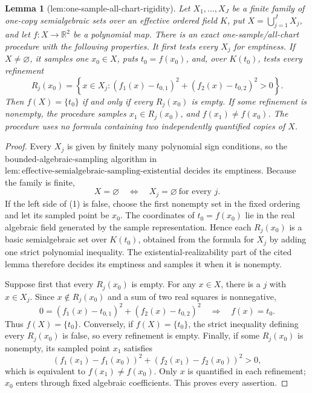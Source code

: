 \documentclass{article}
\newtheorem{lemma}{Lemma}
\begin{document}
\begin{lemma}[lem:one-sample-all-chart-rigidity]\label{lem:one-sample-all-chart-rigidity}
Let \(X_1,\ldots,X_J\) be a finite family of one-copy semialgebraic sets over an effective ordered field \(K\), put \(X=\bigcup_{j=1}^J X_j\), and let \(f:X\to\mathbb R^2\) be a polynomial map. There is an exact one-sample/all-chart procedure with the following properties. It first tests every \(X_j\) for emptiness. If \(X\neq\varnothing\), it samples one \(x_0\in X\), puts \(t_0=f(x_0)\), and, over \(K(t_0)\), tests every refinement
\[
 R_j(x_0)=\left\{x\in X_j:
 (f_1(x)-t_{0,1})^2+(f_2(x)-t_{0,2})^2>0\right\}.
\]
Then \(f(X)=\{t_0\}\) if and only if every \(R_j(x_0)\) is empty. If some refinement is nonempty, the procedure samples \(x_1\in R_j(x_0)\), and \(f(x_1)\neq f(x_0)\). The procedure uses no formula containing two independently quantified copies of \(X\).
\end{lemma}
\begin{proof}
Every \(X_j\) is given by finitely many polynomial sign conditions, so the bounded-algebraic-sampling algorithm in \(\mathrm{lem:effective\text{-}semialgebraic\text{-}sampling\text{-}existential}\) decides its emptiness. Because the family is finite,
\[
 X=\varnothing
 \quad\Longleftrightarrow\quad
 X_j=\varnothing\ \text{for every }j. \tag{1}
\]
If the left side of (1) is false, choose the first nonempty set in the fixed ordering and let its sampled point be \(x_0\). The coordinates of \(t_0=f(x_0)\) lie in the real algebraic field generated by the sample representation. Hence each \(R_j(x_0)\) is a basic semialgebraic set over \(K(t_0)\), obtained from the formula for \(X_j\) by adding one strict polynomial inequality. The existential-realizability part of the cited lemma therefore decides its emptiness and samples it when it is nonempty.

Suppose first that every \(R_j(x_0)\) is empty. For any \(x\in X\), there is a \(j\) with \(x\in X_j\). Since \(x\notin R_j(x_0)\) and a sum of two real squares is nonnegative,
\[
 0=(f_1(x)-t_{0,1})^2+(f_2(x)-t_{0,2})^2
 \quad\Longrightarrow\quad f(x)=t_0. \tag{2}
\]
Thus \(f(X)=\{t_0\}\). Conversely, if \(f(X)=\{t_0\}\), the strict inequality defining every \(R_j(x_0)\) is false, so every refinement is empty. Finally, if some \(R_j(x_0)\) is nonempty, its sampled point \(x_1\) satisfies
\[
 (f_1(x_1)-f_1(x_0))^2+(f_2(x_1)-f_2(x_0))^2>0,
\]
which is equivalent to \(f(x_1)\neq f(x_0)\). Only \(x\) is quantified in each refinement; \(x_0\) enters through fixed algebraic coefficients. This proves every assertion.
\end{proof}
\end{document}
